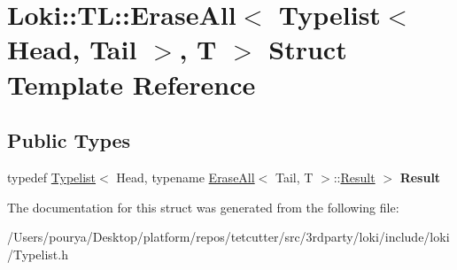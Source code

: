 \hypertarget{structLoki_1_1TL_1_1EraseAll_3_01Typelist_3_01Head_00_01Tail_01_4_00_01T_01_4}{}\section{Loki\+:\+:T\+L\+:\+:Erase\+All$<$ Typelist$<$ Head, Tail $>$, T $>$ Struct Template Reference}
\label{structLoki_1_1TL_1_1EraseAll_3_01Typelist_3_01Head_00_01Tail_01_4_00_01T_01_4}
\subsection*{Public Types}
\begin{DoxyCompactItemize}
\item 
\hypertarget{structLoki_1_1TL_1_1EraseAll_3_01Typelist_3_01Head_00_01Tail_01_4_00_01T_01_4_aa9d5487bbedb8549b5e23866848d88bb}{}typedef \hyperlink{structLoki_1_1Typelist}{Typelist}$<$ Head, typename \hyperlink{structLoki_1_1TL_1_1EraseAll}{Erase\+All}$<$ Tail, T $>$\+::\hyperlink{structLoki_1_1Typelist}{Result} $>$ {\bfseries Result}\label{structLoki_1_1TL_1_1EraseAll_3_01Typelist_3_01Head_00_01Tail_01_4_00_01T_01_4_aa9d5487bbedb8549b5e23866848d88bb}

\end{DoxyCompactItemize}


The documentation for this struct was generated from the following file\+:\begin{DoxyCompactItemize}
\item 
/\+Users/pourya/\+Desktop/platform/repos/tetcutter/src/3rdparty/loki/include/loki/Typelist.\+h\end{DoxyCompactItemize}
